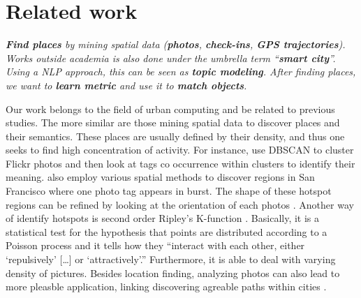 \chapter{Related work}
\label{chap:related}

\emph{%
\textbf{Find places} by mining spatial data (\textbf{photos},
\textbf{check-ins}, \textbf{GPS trajectories}). Works outside academia is also
done under the umbrella term \enquote{\textbf{smart city}}. Using a NLP
approach, this can be seen as \textbf{topic modeling}. After finding places,
we want to \textbf{learn metric} and use it to \textbf{match objects}.
}

Our work belongs to the field of urban computing and be related to previous
studies. The more similar are those mining spatial data to discover places and
their semantics. These places are usually defined by their density, and thus
one seeks to find high concentration of activity. For instance,
\textcite{Deng2009} use DBSCAN to cluster Flickr photos and then look at tags
co occurrence within clusters to identify their meaning.
\Textcite{Rattenbury2009} also employ various spatial methods to discover
regions in San Francisco where one photo tag appears in burst. The shape of
these hotspot regions can be refined by looking at the orientation of each
photos \autocite{Hotspots12}. Another way of identify hotspots is second order
Ripley's K-function \autocite{TagHotspot12}. Basically, it is a statistical
test for the hypothesis that points are distributed according to a Poisson
process and it tells how they \enquote{interact with each other, either
\enquote{repulsively} [\dots] or \enquote{attractively}.} Furthermore, it is
able to deal with varying density of pictures. Besides location finding,
analyzing photos can also lead to more pleasble application, linking
discovering agreable paths within cities \autocite{Quercia2014}.

